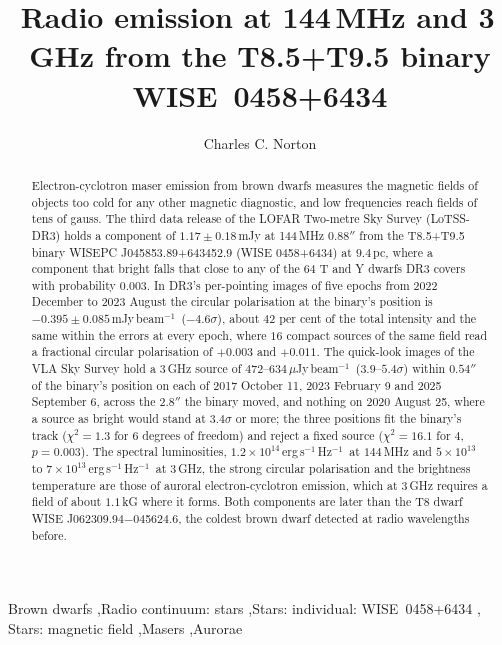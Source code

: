 \documentclass[3p,11pt]{elsarticle}
\newcommand{\mJyb}{mJy\,beam$^{-1}$}
\newcommand{\uJyb}{$\mu$Jy\,beam$^{-1}$}
\newcommand{\lnu}{erg\,s$^{-1}$\,Hz$^{-1}$}
\newcommand{\sci}[2]{#1\times10^{#2}}
\begin{document}
\begin{frontmatter}

\title{Radio emission at 144\,MHz and 3\,GHz from the T8.5+T9.5 binary WISE~0458+6434}

\author{Charles C. Norton}

\begin{abstract}
Electron-cyclotron maser emission from brown dwarfs measures the magnetic fields of
objects too cold for any other magnetic diagnostic, and low frequencies reach fields of
tens of gauss. The third data release of the LOFAR Two-metre Sky Survey (LoTSS-DR3)
holds a component of $1.17\pm0.18$\,mJy at 144\,MHz $0.88''$ from the T8.5+T9.5 binary
WISEPC J045853.89+643452.9 (WISE 0458+6434) at $9.4$\,pc, where a component that bright
falls that close to any of the $64$ T and Y dwarfs DR3 covers with probability $0.003$.
In DR3's per-pointing images of five epochs from 2022 December to 2023 August the
circular polarisation at the binary's position is $-0.395\pm0.085$\,\mJyb\ ($-4.6\sigma$),
about $42$ per cent of the total intensity and the same within the errors at every epoch,
where $16$ compact sources of the same field read a fractional circular polarisation of
$+0.003$ and $+0.011$. The quick-look images of the VLA Sky Survey hold a $3$\,GHz source
of $472$--$634$\,\uJyb\ ($3.9$--$5.4\sigma$) within $0.54''$ of the binary's position on
each of 2017 October 11, 2023 February 9 and 2025 September 6, across the $2.8''$ the
binary moved, and nothing on 2020 August 25, where a source as bright would stand at
$3.4\sigma$ or more; the three positions fit the
binary's track ($\chi^2=1.3$ for $6$ degrees of freedom) and reject a fixed source
($\chi^2=16.1$ for $4$, $p=0.003$). The spectral luminosities, $\sci{1.2}{14}$\,\lnu\ at
$144$\,MHz and $\sci{5}{13}$ to $\sci{7}{13}$\,\lnu\ at $3$\,GHz, the strong circular
polarisation and the brightness temperature are those of auroral electron-cyclotron
emission, which at $3$\,GHz requires a field of about $1.1$\,kG where it forms. Both
components are later than the T8 dwarf WISE J062309.94$-$045624.6, the coldest brown
dwarf detected at radio wavelengths before.
\end{abstract}

\begin{keyword}
Brown dwarfs \sep Radio continuum: stars \sep Stars: individual: WISE~0458+6434 \sep
Stars: magnetic field \sep Masers \sep Aurorae
\end{keyword}

\end{frontmatter}
\end{document}
